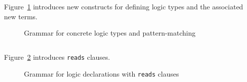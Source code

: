 \nodiff

Figure~\ref{fig:gram:logictype} introduces new constructs for defining logic
types and the associated new terms.

\begin{figure}[htp]
  \begin{cadre}
      
    \end{cadre}
  \caption{Grammar for concrete logic types and pattern-matching}
\label{fig:gram:logictype}
\end{figure}


\subsection{}
\label{sec:logicalstates}
\nodiff



\subsection{}
\label{sec:reads}
\experimental

\nodiff

Figure~\ref{fig:gram:logicreads} introduces \lstinline|reads| clauses.

\begin{figure}[htp]
  \begin{cadre}
      
    \end{cadre}
  \caption{Grammar for logic declarations with \lstinline|reads| clauses}
\label{fig:gram:logicreads}
\end{figure}




